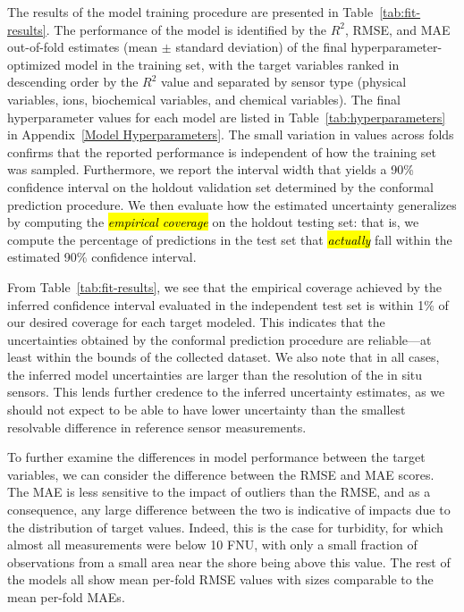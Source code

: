 \documentclass[remotesensing,article,accept,pdftex,moreauthors]{Definitions/mdpi}
\begin{document}
The results of the model training procedure are presented in Table~\ref{tab:fit-results}. The performance of the model is identified by the $R^2$, RMSE, and MAE out-of-fold estimates (mean $\pm$ standard deviation) of the final hyperparameter-optimized model in the training set, with the target variables ranked in descending order by the $R^2$ value and separated by sensor type (physical variables, ions, biochemical variables, and chemical variables). The final hyperparameter values for each model are listed in Table~\ref{tab:hyperparameters} in Appendix~\ref{Model Hyperparameters}. The small variation in values across folds confirms that the reported performance is independent of how the training set was sampled. Furthermore, we report the interval width that yields a 90\% confidence interval on the holdout validation set determined by the conformal prediction procedure. We then evaluate how the estimated uncertainty generalizes by computing the \textit{\hl{empirical coverage}} on the holdout testing set: that is, we compute the percentage of predictions in the test set that \textit{\hl{actually}} fall within the estimated 90\% confidence interval. 

From Table~\ref{tab:fit-results},  we see that the empirical coverage achieved by the inferred confidence interval evaluated in the independent test set is within 1\% of our desired coverage for each target modeled. This indicates that the uncertainties obtained by the conformal prediction procedure are reliable---at least within the bounds of the collected dataset. We also note that in all cases, the inferred model uncertainties are larger than the resolution of the in situ sensors. This lends further credence to the inferred uncertainty estimates, as we should not expect to be able to have lower uncertainty than the smallest resolvable difference in reference sensor measurements.

To further examine the differences in model performance between the target variables, we can consider the difference between the RMSE and MAE scores. The MAE is less sensitive to the impact of outliers than the RMSE, and as a consequence, any large difference between the two is indicative of impacts due to the distribution of target values. Indeed, this is the case for turbidity, for which almost all measurements were below 10 FNU, with only a small fraction of observations from a small area near the shore being above this value. %
The rest of the models all show mean per-fold RMSE values with sizes comparable to the mean per-fold MAEs. 
\end{document}
